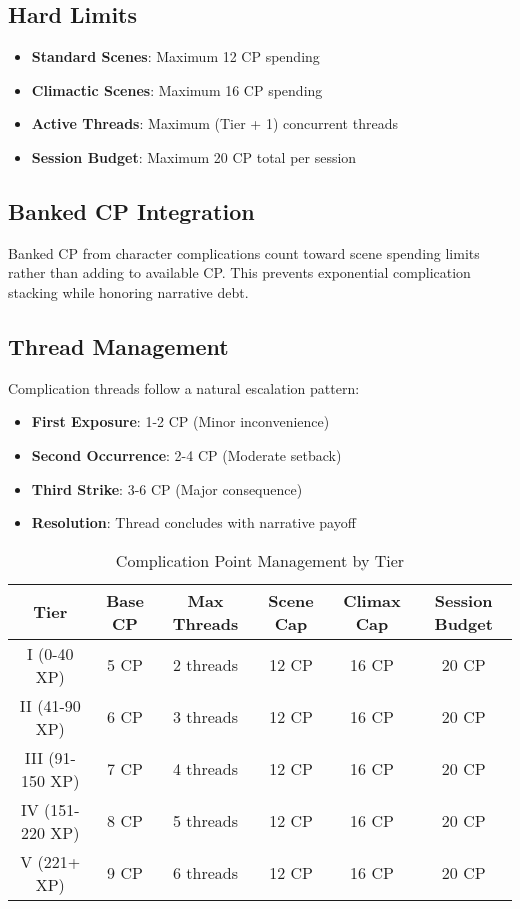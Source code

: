 \subsection{Hard Limits}
\begin{itemize}
    \item \textbf{Standard Scenes}: Maximum 12 CP spending
    \item \textbf{Climactic Scenes}: Maximum 16 CP spending
    \item \textbf{Active Threads}: Maximum (Tier + 1) concurrent threads
    \item \textbf{Session Budget}: Maximum 20 CP total per session
\end{itemize}

\subsection{Banked CP Integration}
Banked CP from character complications count toward scene spending limits rather than adding to available CP. This prevents exponential complication stacking while honoring narrative debt.

\subsection{Thread Management}
Complication threads follow a natural escalation pattern:
\begin{itemize}
    \item \textbf{First Exposure}: 1-2 CP (Minor inconvenience)
    \item \textbf{Second Occurrence}: 2-4 CP (Moderate setback)
    \item \textbf{Third Strike}: 3-6 CP (Major consequence)
    \item \textbf{Resolution}: Thread concludes with narrative payoff
\end{itemize}

\begin{table}[htbp]
\centering
\caption{Complication Point Management by Tier}
\begin{tabular}{|c|c|c|c|c|c|}
\hline
\textbf{Tier} & \textbf{Base CP} & \textbf{Max Threads} & \textbf{Scene Cap} & \textbf{Climax Cap} & \textbf{Session Budget} \\
\hline
I (0-40 XP) & 5 CP & 2 threads & 12 CP & 16 CP & 20 CP \\
II (41-90 XP) & 6 CP & 3 threads & 12 CP & 16 CP & 20 CP \\
III (91-150 XP) & 7 CP & 4 threads & 12 CP & 16 CP & 20 CP \\
IV (151-220 XP) & 8 CP & 5 threads & 12 CP & 16 CP & 20 CP \\
V (221+ XP) & 9 CP & 6 threads & 12 CP & 16 CP & 20 CP \\
\hline
\end{tabular}
\end{table}

